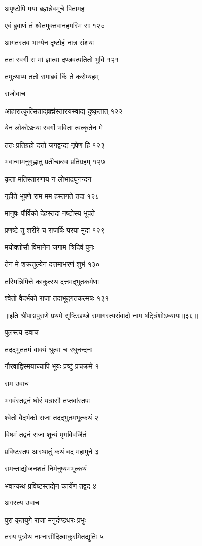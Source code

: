 अपृष्टोपि मया ब्रह्मन्नेवमूचे पितामहः

एवं ब्रुवाणं तं श्वेतमुक्तवानहमस्मि सः १२०

आगतस्तव भाग्येन दृष्टोहं नात्र संशयः

ततः स्वर्गी स मां ज्ञात्वा दण्डवत्पतितो भुवि १२१

तमुत्थाप्य ततो रामाब्रवं किं ते करोम्यहम्

राजोवाच

आहारात्कुत्सिताद्ब्रह्मंस्तारयस्वाद्य दुष्कृतात् १२२

येन लोकोऽक्षयः स्वर्गो भविता त्वत्कृतेन मे

ततः प्रतिग्रहो दत्तो जगद्वन्द्य नृपेण हि १२३

भवान्मामनुगृह्णातु प्रतीच्छस्व प्रतिग्रहम् १२७

कृता मतिस्तारणाय न लोभाद्रघुनन्दन

गृहीते भूषणे राम मम हस्तगते तदा १२८

मानुषः पौर्विको देहस्तदा नष्टोस्य भूपते

प्रणष्टे तु शरीरे च राजर्षिः परया मुदा १२९

मयोक्तोसौ विमानेन जगाम त्रिदिवं पुनः

तेन मे शक्रतुल्येन दत्तमाभरणं शुभं १३०

तस्मिन्निमित्ते काकुत्स्थ दत्तमद्भुतकर्मणा

श्वेतो वैदर्भको राजा तदाभूद्गतकल्मषः १३१

॥इति श्रीपाद्मपुराणे प्रथमे सृष्टिखण्डे रामागस्त्यसंवादो नाम षट्त्रिंशोऽध्यायः॥३६॥


पुलस्त्य उवाच

तदद्भुततमं वाक्यं श्रुत्वा च रघुनन्दनः

गौरवाद्विस्मयाच्चापि भूयः प्रष्टुं प्रचक्रमे १

राम उवाच

भगवंस्तद्वनं घोरं यत्रासौ तप्तवांस्तपः

श्वेतो वैदर्भको राजा तदद्भुतमभूत्कथं २

विषमं तद्वनं राजा शून्यं मृगविवर्जितं

प्रविष्टस्तप आस्थातुं कथं वद महामुने ३

समन्ताद्योजनशतं निर्मनुष्यमभूत्कथं

भवान्कथं प्रविष्टस्तद्येन कार्येण तद्वद ४

अगस्त्य उवाच

पुरा कृतयुगे राजा मनुर्दण्डधरः प्रभुः

तस्य पुत्रोथ नाम्नासीदिक्ष्वाकुरमितद्युतिः ५

